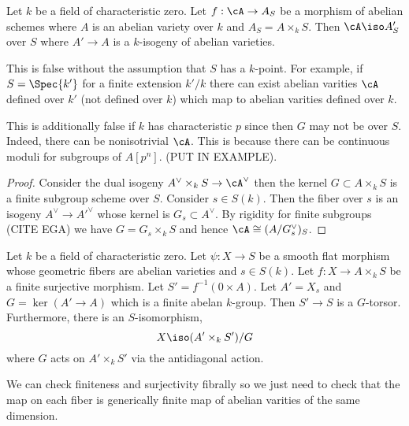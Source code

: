 \documentclass[12pt]{article}
\begin{document}
\begin{lemma}
Let $k$ be a field of characteristic zero. Let $f : \cA \to A_S$ be a morphism of abelian schemes where $A$ is an abelian variety over $k$ and $A_S = A \times_k S$. Then $\cA \iso A'_S$ over $S$ where $A' \to A$ is a $k$-isogeny of abelian varieties. 
\end{lemma}

\begin{example}
This is false without the assumption that $S$ has a $k$-point. For example, if $S = \Spec{k'}$ for a finite extension $k'/k$ there can exist abelian varities $\cA$ defined over $k'$ (not defined over $k$) which map to abelian varities defined over $k$.  
\end{example}

\begin{example}
This is additionally false if $k$ has characteristic $p$ since then $G$ may not be \etale over $S$. Indeed, there can be nonisotrivial $\cA$. This is because there can be continuous moduli for subgroups of $A[p^n]$. (PUT IN EXAMPLE).
\end{example}

\begin{proof}
Consider the dual isogeny $A^\vee \times_k S \to \cA^\vee$ then the kernel $G \subset A \times_k S$ is a finite \etale subgroup scheme over $S$. Consider $s \in S(k)$. Then the fiber over $s$ is an isogeny $A^\vee \to A'^\vee$ whose kernel is $G_s \subset A^\vee$. By rigidity for finite \etale subgroups (CITE EGA) we have $G = G_s \times_k S$ and hence $\cA \cong (A/G_s^\vee)_S$. 
\end{proof}

\begin{prop}
Let $k$ be a field of characteristic zero. Let $\psi : X \to S$ be a smooth flat morphism whose geometric fibers are abelian varieties and $s \in S(k)$. Let $f : X \to A \times_k S$ be a finite surjective morphism. Let $S' = f^{-1}(0 \times A)$. Let $A' = X_s$ and $G = \ker{(A' \to A)}$ which is a finite abelan \etale $k$-group. Then $S' \to S$ is a $G$-torsor. Furthermore, there is an $S$-isomorphism,
\[ X \iso (A' \times_k S')/G \]
where $G$ acts on $A' \times_k S'$ via the antidiagonal action.
\end{prop}

\begin{rmk}
We can check finiteness and surjectivity fibrally so we just need to check that the map on each fiber is generically finite map of abelian varities of the same dimension. 
\end{rmk}
\end{document}
